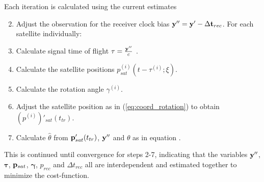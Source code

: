 \documentclass[]{article}
\begin{document}
Each iteration is calculated using the current estimates
\begin{enumerate}
\setcounter{enumi}{1}
\item Adjust the observation for the receiver clock bias ${\bf y}''={\bf y}'-\Delta {\bf t}_{rec}$.
For each satellite individually:
\item Calculate signal time of flight $\tau=\frac{\bf y''}{c}$ .
\item Calculate the satellite positions $p^{(i)}_{sat}(t-\tau^{(i)};\xi)$.
\item Calculate the rotation angle $\gamma^{(i)}$.
\item Adjust the satellite position as in (\ref{eq:coord_rotation}) to obtain $(p^{(i)})'_{sat}(t_{tr})$.
\item Calculate $\hat{\theta}$ from ${\bf p}'_{sat}(t_{tr})$, $\bf y''$ and $\theta$ as in equation . 
\end{enumerate}
This is continued until convergence for steps 2-7, indicating that the variables ${\bf y}''$, $\boldsymbol \tau$, ${\bf p}_{sat}$, $\boldsymbol \gamma$, $p_{rec}$ and $\Delta t_{rec}$ all are interdependent and estimated together to minimize the cost-function.
\end{document}
